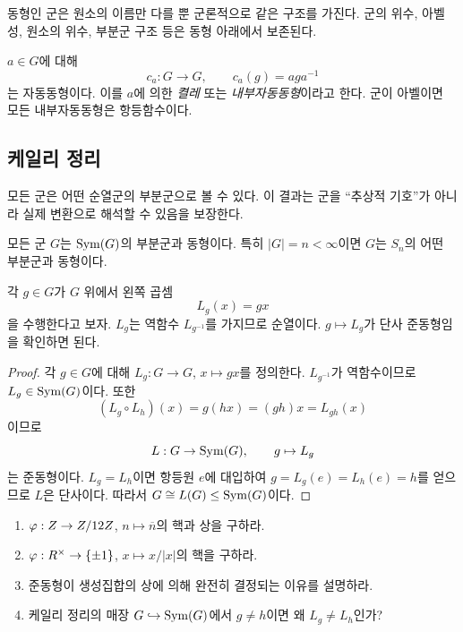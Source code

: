 동형인 군은 원소의 이름만 다를 뿐 군론적으로 같은 구조를 가진다. 군의 위수, 아벨성, 원소의 위수, 부분군 구조 등은 동형 아래에서 보존된다.

\begin{example}[내부자동동형]
$a\in G$에 대해
\[
  c_a:G\to G,\qquad c_a(g)=aga^{-1}
\]
는 자동동형이다. 이를 $a$에 의한 \emph{켤레} 또는 \emph{내부자동동형}이라고 한다. 군이 아벨이면 모든 내부자동동형은 항등함수이다.
\end{example}

\subsection{케일리 정리}

모든 군은 어떤 순열군의 부분군으로 볼 수 있다. 이 결과는 군을 ``추상적 기호''가 아니라 실제 변환으로 해석할 수 있음을 보장한다.

\begin{theorem}[케일리 정리]
모든 군 $G$는 $\operatorname{Sym}(G)$의 부분군과 동형이다. 특히 $|G|=n<\infty$이면 $G$는 $S_n$의 어떤 부분군과 동형이다.
\end{theorem}

\begin{proofidea}
각 $g\in G$가 $G$ 위에서 왼쪽 곱셈
\[
  L_g(x)=gx
\]
을 수행한다고 보자. $L_g$는 역함수 $L_{g^{-1}}$를 가지므로 순열이다. $g\mapsto L_g$가 단사 준동형임을 확인하면 된다.
\end{proofidea}

\begin{proof}
각 $g\in G$에 대해 $L_g:G\to G$, $x\mapsto gx$를 정의한다. $L_{g^{-1}}$가 역함수이므로 $L_g\in\operatorname{Sym}(G)$이다. 또한
\[
  (L_g\circ L_h)(x)=g(hx)=(gh)x=L_{gh}(x)
\]
이므로
\[
  L:G\to\operatorname{Sym}(G),\qquad g\mapsto L_g
\]
는 준동형이다. $L_g=L_h$이면 항등원 $e$에 대입하여 $g=L_g(e)=L_h(e)=h$를 얻으므로 $L$은 단사이다. 따라서 $G\cong L(G)\le\operatorname{Sym}(G)$이다.
\end{proof}

\begin{checkpoint}
\begin{enumerate}[label=\arabic*.]
  \item $\varphi:Z\to Z/12Z$, $n\mapsto\overline n$의 핵과 상을 구하라.
  \item $\varphi:R^\times\to\{\pm1\}$, $x\mapsto x/|x|$의 핵을 구하라.
  \item 준동형이 생성집합의 상에 의해 완전히 결정되는 이유를 설명하라.
  \item 케일리 정리의 매장 $G\hookrightarrow\operatorname{Sym}(G)$에서 $g\ne h$이면 왜 $L_g\ne L_h$인가?
\end{enumerate}
\end{checkpoint}
